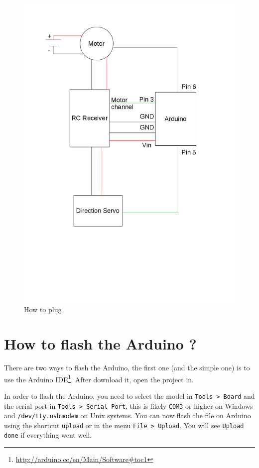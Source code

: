 \documentclass[a4paper,11pt]{report}
\begin{document}
\begin{figure}[!ht]
\centering
\includegraphics[scale=0.5]{img_static/wires}
\caption{How to plug}
\label{fig:wires}
\end{figure}

\section{How to flash the Arduino ?}

There are two ways to flash the Arduino, the first one (and the simple one) is
to use the Arduino IDE\footnote{\url{http://arduino.cc/en/Main/Software\#toc1}}. After
download it, open the project in.

In order to flash the Arduino, you need to select the model in \texttt{Tools >
Board} and the serial port in \texttt{Tools > Serial Port}, this is likely
\texttt{COM3} or higher on Windows and \texttt{/dev/tty.usbmodem} on Unix systems.
You can now flash the file on Arduino using the shortcut \texttt{upload} or in
the menu \texttt{File > Upload}. You will see \texttt{Upload done} if everything
went well.
\end{document}
